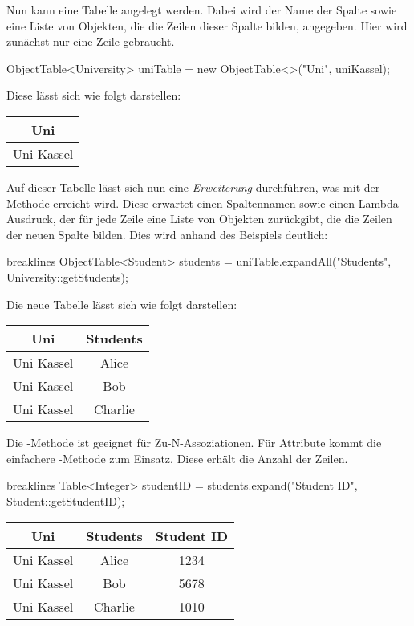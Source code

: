 Nun kann eine Tabelle angelegt werden.
Dabei wird der Name der Spalte sowie eine Liste von Objekten, die die Zeilen dieser Spalte bilden, angegeben.
Hier wird zunächst nur eine Zeile gebraucht.

\begin{jcodeblock}
    ObjectTable<University> uniTable = new ObjectTable<>("Uni", uniKassel);
\end{jcodeblock}

Diese lässt sich wie folgt darstellen:

\begin{tabular}{|c|}
    \hline
    \textbf{Uni} \\
    \hline
    Uni Kassel \\
    \hline
\end{tabular}

Auf dieser Tabelle lässt sich nun eine \emph{Erweiterung} durchführen, was mit der Methode  erreicht wird.
Diese erwartet einen Spaltennamen sowie einen Lambda-Ausdruck,
der für jede Zeile eine Liste von Objekten zurückgibt, die die Zeilen der neuen Spalte bilden.
Dies wird anhand des Beispiels deutlich:

\begin{jcodeblock*}{breaklines}
    ObjectTable<Student> students = uniTable.expandAll("Students", University::getStudents);
\end{jcodeblock*}

Die neue Tabelle lässt sich wie folgt darstellen:

\begin{tabular}{|c|c|}
    \hline
    \textbf{Uni} & \textbf{Students} \\
    \hline
    Uni Kassel & Alice   \\
    Uni Kassel & Bob     \\
    Uni Kassel & Charlie \\
    \hline
\end{tabular}

Die -Methode ist geeignet für Zu-N-Assoziationen.
Für Attribute kommt die einfachere -Methode zum Einsatz.
Diese erhält die Anzahl der Zeilen.

\begin{jcodeblock*}{breaklines}
    Table<Integer> studentID = students.expand("Student ID", Student::getStudentID);
\end{jcodeblock*}

\begin{tabular}{|c|c|c|}
    \hline
    \textbf{Uni} & \textbf{Students} & \textbf{Student ID} \\
    \hline
    Uni Kassel & Alice   & 1234 \\
    Uni Kassel & Bob     & 5678 \\
    Uni Kassel & Charlie & 1010 \\
    \hline
\end{tabular}

